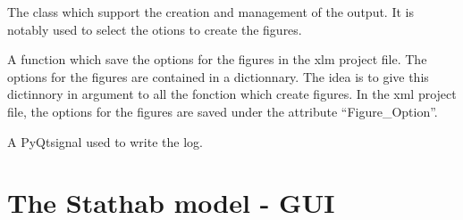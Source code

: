 \documentclass[letterpaper,10pt,english]{sphinxmanual}
\begin{document}
\begin{fulllineitems}
\label{\detokenize{index:src_GUI.output_fig_GUI.outputW}}
The class which support the creation and management of the output. It is notably used to select the otions to
create the figures.

\begin{fulllineitems}
\label{\detokenize{index:src_GUI.output_fig_GUI.outputW.init_iu}}
\end{fulllineitems}


\begin{fulllineitems}
\label{\detokenize{index:src_GUI.output_fig_GUI.outputW.save_option_fig}}
A function which save the options for the figures in the xlm project file. The options for the figures are
contained in a dictionnary. The idea is to give this dictinnory in argument to all the fonction which create
figures. In the xml project file, the options for the figures are saved under the attribute ``Figure\_Option''.

\end{fulllineitems}


\begin{fulllineitems}
\label{\detokenize{index:src_GUI.output_fig_GUI.outputW.send_log}}
A PyQtsignal used to write the log.

\end{fulllineitems}


\end{fulllineitems}



\section{The Stathab model - GUI}
\label{\detokenize{index:module-src_GUI.stathab_GUI}}\label{\detokenize{index:the-stathab-model-gui}}
\end{document}
